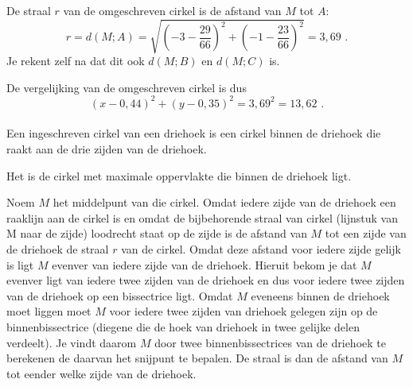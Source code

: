 \begin{voorbeeld}
De straal $r$ van de omgeschreven cirkel is de afstand van $M$ tot $A$:
\[
r=d(M;A)=\sqrt {\left(  -3-\frac {29}{66} \right)^2+\left( -1-\frac {23}{66} \right)^2}=3,69 \text { .}
\]
Je rekent zelf na dat dit ook $d(M;B)$ en $d(M;C)$ is.

De vergelijking van de omgeschreven cirkel is dus
\[
(x-0,44)^2+(y-0,35)^2=3,69^2=13,62 \text { .}
\]\\

Een ingeschreven cirkel van een driehoek is een cirkel binnen de driehoek die raakt aan de drie zijden van de driehoek.

\begin{center}
	
\end{center}


Het is de cirkel met maximale oppervlakte die binnen de driehoek ligt.

Noem $M$ het middelpunt van die cirkel.
Omdat iedere zijde van de driehoek een raaklijn aan de cirkel is en omdat de bijbehorende straal van cirkel (lijnstuk van M naar de zijde) loodrecht staat op de zijde is de afstand van $M$ tot een zijde van de driehoek de straal $r$ van de cirkel.
Omdat deze afstand voor iedere zijde gelijk is ligt $M$ evenver van iedere zijde van de driehoek.
Hieruit bekom je dat $M$ evenver ligt van iedere twee zijden van de driehoek en dus voor iedere twee zijden van de driehoek op een bissectrice ligt.
Omdat $M$ eveneens binnen de driehoek moet liggen moet $M$ voor iedere twee zijden van driehoek gelegen zijn op de binnenbissectrice (diegene die de hoek van driehoek in twee gelijke delen verdeelt).
Je vindt daarom $M$ door twee binnenbissectrices van de driehoek te berekenen de daarvan het snijpunt te bepalen.
De straal is dan de afstand van $M$ tot eender welke zijde van de driehoek.\\

\end{voorbeeld}

